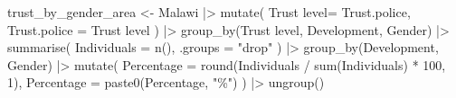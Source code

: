 \documentclass[
  letterpaper,
  DIV=11,
  numbers=noendperiod]{scrartcl}
\newenvironment{Shaded}{\begin{snugshade}}{\end{snugshade}}
\newcommand{\AttributeTok}[1]{\textcolor[rgb]{0.40,0.45,0.13}{#1}}
\newcommand{\DecValTok}[1]{\textcolor[rgb]{0.68,0.00,0.00}{#1}}
\newcommand{\FunctionTok}[1]{\textcolor[rgb]{0.28,0.35,0.67}{#1}}
\newcommand{\NormalTok}[1]{\textcolor[rgb]{0.00,0.23,0.31}{#1}}
\newcommand{\OtherTok}[1]{\textcolor[rgb]{0.00,0.23,0.31}{#1}}
\newcommand{\SpecialCharTok}[1]{\textcolor[rgb]{0.37,0.37,0.37}{#1}}
\newcommand{\StringTok}[1]{\textcolor[rgb]{0.13,0.47,0.30}{#1}}
\begin{document}
\begin{Shaded}
\begin{Highlighting}[]

\NormalTok{trust\_by\_gender\_area }\OtherTok{\textless{}{-}}\NormalTok{ Malawi }\SpecialCharTok{|\textgreater{}}
  \FunctionTok{mutate}\NormalTok{(}
    \StringTok{\textasciigrave{}}\AttributeTok{Trust level}\StringTok{\textasciigrave{}}\OtherTok{=}\NormalTok{ Trust.police,}
    \AttributeTok{Trust.police =} \StringTok{\textasciigrave{}}\AttributeTok{Trust level}\StringTok{\textasciigrave{}}
\NormalTok{  ) }\SpecialCharTok{|\textgreater{}}
  \FunctionTok{group\_by}\NormalTok{(}\StringTok{\textasciigrave{}}\AttributeTok{Trust level}\StringTok{\textasciigrave{}}\NormalTok{, Development, Gender) }\SpecialCharTok{|\textgreater{}}
  \FunctionTok{summarise}\NormalTok{(}
    \AttributeTok{Individuals =} \FunctionTok{n}\NormalTok{(), }\AttributeTok{.groups =} \StringTok{"drop"}
\NormalTok{    ) }\SpecialCharTok{|\textgreater{}}
  \FunctionTok{group\_by}\NormalTok{(Development, Gender) }\SpecialCharTok{|\textgreater{}}
  \FunctionTok{mutate}\NormalTok{(}
    \AttributeTok{Percentage =} \FunctionTok{round}\NormalTok{(Individuals }\SpecialCharTok{/} \FunctionTok{sum}\NormalTok{(Individuals) }\SpecialCharTok{*} \DecValTok{100}\NormalTok{, }\DecValTok{1}\NormalTok{),}
    \AttributeTok{Percentage =} \FunctionTok{paste0}\NormalTok{(Percentage, }\StringTok{"\%"}\NormalTok{)}
\NormalTok{  ) }\SpecialCharTok{|\textgreater{}}
  \FunctionTok{ungroup}\NormalTok{()}


\end{Highlighting}
\end{Shaded}
\end{document}
